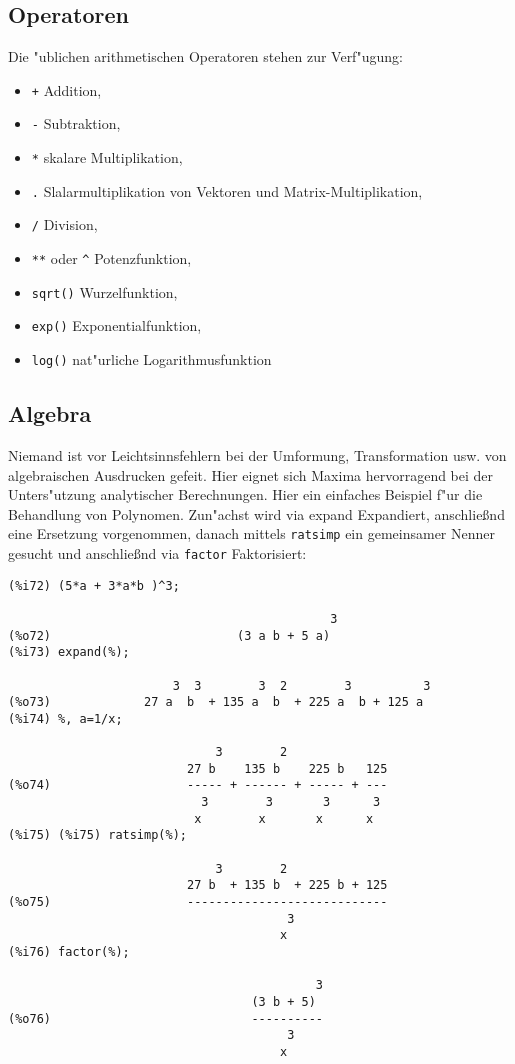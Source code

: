 \documentclass[spanish,12pt,a4paper]{article}
\begin{document}
\subsection{Operatoren}

Die "ublichen arithmetischen Operatoren stehen zur Verf"ugung:

\begin{itemize}
\item \verb|+|  Addition,
\item \verb|-| Subtraktion,
\item \verb|*| skalare Multiplikation,
\item \verb|.| Slalarmultiplikation von Vektoren und Matrix-Multiplikation,
\item \verb|/| Division,
\item \verb|**| oder \verb|^| Potenzfunktion,
\item \verb|sqrt()| Wurzelfunktion,
\item \verb|exp()| Exponentialfunktion,
\item \verb|log()| nat"urliche Logarithmusfunktion
\end{itemize}


\subsection{Algebra}

Niemand ist vor Leichtsinnsfehlern bei der Umformung, Transformation usw. von algebraischen Ausdrucken gefeit. Hier eignet sich Maxima hervorragend bei der Unters"utzung analytischer Berechnungen.
Hier ein einfaches Beispiel f"ur die Behandlung von Polynomen. Zun"achst wird via expand Expandiert, anschlie{\ss}nd eine Ersetzung vorgenommen, danach mittels \verb|ratsimp| ein gemeinsamer Nenner gesucht und anschlie{\ss}nd via \verb|factor| Faktorisiert:

\scriptsize
\begin{verbatim}
(%i72) (5*a + 3*a*b )^3;

                                             3
(%o72)                          (3 a b + 5 a)
(%i73) expand(%);

                       3  3        3  2        3          3
(%o73)             27 a  b  + 135 a  b  + 225 a  b + 125 a
(%i74) %, a=1/x;

                             3        2
                         27 b    135 b    225 b   125
(%o74)                   ----- + ------ + ----- + ---
                           3        3       3      3
                          x        x       x      x
(%i75) (%i75) ratsimp(%);

                             3        2
                         27 b  + 135 b  + 225 b + 125
(%o75)                   ----------------------------
                                       3
                                      x
(%i76) factor(%);

                                           3
                                  (3 b + 5)
(%o76)                            ----------
                                       3
                                      x
\end{verbatim}
\normalsize
\end{document}
